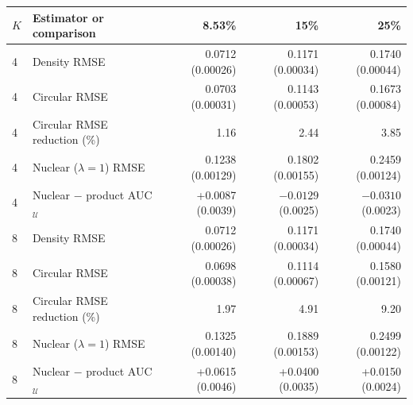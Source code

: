 \begin{tabular}{llrrr}
\toprule
$K$ & Estimator or comparison & 8.53\% & 15\% & 25\% \\
\midrule
4 & Density RMSE & 0.0712 (0.00026) & 0.1171 (0.00034) & 0.1740 (0.00044) \\
4 & Circular RMSE & 0.0703 (0.00031) & 0.1143 (0.00053) & 0.1673 (0.00084) \\
4 & Circular RMSE reduction (\%) & 1.16 & 2.44 & 3.85 \\
4 & Nuclear ($\lambda=1$) RMSE & 0.1238 (0.00129) & 0.1802 (0.00155) & 0.2459 (0.00124) \\
4 & Nuclear $-$ product AUC$_{\mathcal U}$ & +0.0087 (0.0039) & $-0.0129$ (0.0025) & $-0.0310$ (0.0023) \\
\midrule
8 & Density RMSE & 0.0712 (0.00026) & 0.1171 (0.00034) & 0.1740 (0.00044) \\
8 & Circular RMSE & 0.0698 (0.00038) & 0.1114 (0.00067) & 0.1580 (0.00121) \\
8 & Circular RMSE reduction (\%) & 1.97 & 4.91 & 9.20 \\
8 & Nuclear ($\lambda=1$) RMSE & 0.1325 (0.00140) & 0.1889 (0.00153) & 0.2499 (0.00122) \\
8 & Nuclear $-$ product AUC$_{\mathcal U}$ & +0.0615 (0.0046) & +0.0400 (0.0035) & +0.0150 (0.0024) \\
\bottomrule
\end{tabular}
